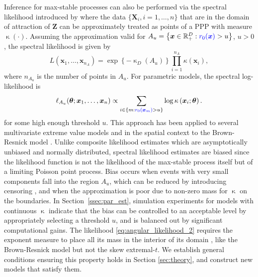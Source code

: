 \documentclass[12pt]{article}
\newcommand{\PZ}{\textcolor{blue}}
\begin{document}
Inference for max-stable processes can also be performed via the spectral likelihood introduced by \citet{Coles.Tawn:1991} where the data $\{\bm X_i,i=1,\dots,n\}$ that are in the domain of attraction of $\bm Z$ can be approximately treated as points of a PPP with measure $\upkappa(\cdot)$. Assuming the approximation valid for $A_{u} = \left\{ \bx \in \real^D_+: \PZ{r_0(\bx)} > u\right\}$, $u>0$, the spectral likelihood is given by
%
\begin{equation}
\label{eq:angular_likelihood_1}
L(\bm x_1,\dots,\bm x_{n_{A}}) 
= \exp\left\{-\upkappa_D(A_{u})\right\} \prod_{i=1}^{n_{A}}\kappa(\bm x_i), 
\end{equation}
%
where $n_{A_u}$ is the number of points in $A_{u}$. 
For parametric models,
the spectral log-likelihood is 
%
\begin{equation}
\label{eq:angular_likelihood_2}
\ell_{A_u}(\bm \theta;\bx_1,\dots,\bx_n) \propto 
\sum_{i \in \{m: \PZ{r_0(\bx_m)} > u\}} 
\log \kappa\left( \bm x_i;\bm \theta\right). 
\end{equation} 
%
for some high enough threshold $u$. This approach has been applied to several multivariate extreme value models \citep[see, e.g.,][]{Cooley.etal:2010,Engelke.etal:2015, Beranger.Padoan:2015, Sabourin.etal2013} and in the spatial context to the Brown-Resnick model \citep{Engelke.etal:2015}.
%
Unlike composite likelihood estimates which are asymptotically unbiased and normally distributed, spectral likelihood estimates are biased since the likelihood function is not the likelihood of the max-stable process itself but of a limiting Poisson point process. 
Bias occurs when events with very small components fall into the region $A_{u}$, which can be reduced by introducing censoring \citep[see][]{Wadsworth.Tawn:2014, Thibaud.Opitz:2015}, and when the approximation is poor due to non-zero mass for $\upkappa$ on the boundaries. In Section~\ref{ssec:par_est}, simulation experiments for models with continuous $\upkappa$ indicate that the bias can be controlled to an acceptable level by appropriately selecting a threshold $u$, and is balanced out by significant computational gains. 
The likelihood \eqref{eq:angular_likelihood_2} requires the exponent measure to place all its mass in the interior of its domain \citep{Thibaud.Opitz:2015}, like the Brown-Resnick model but not the skew extremal-$t$.
We establish general conditions ensuring this property holds in Section \ref{sec:theory}, and construct new models that satisfy them. 
\end{document}
